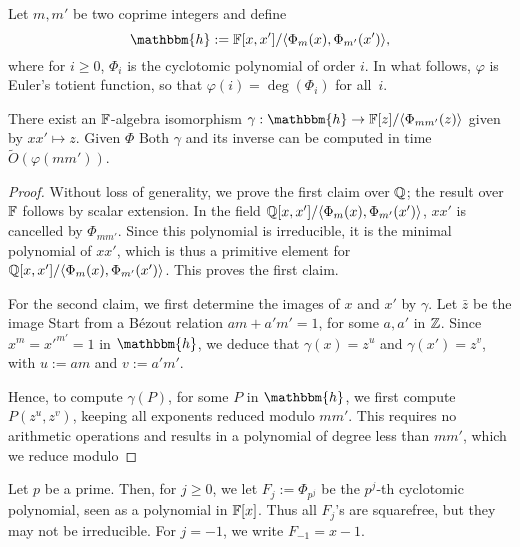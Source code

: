 Let $m,m'$ be two coprime integers and define
$$\mathbbm{h}:=\F[x,x']/\langle \Phi_{m}(x), \Phi_{m'}(x')\rangle,$$
where for $i \ge 0$, $\Phi_i$ is the cyclotomic polynomial of order
$i$. In what follows, $\varphi$ is Euler's totient function, so that
$\varphi(i) = \deg(\Phi_i)$ for all~$i$.
\begin{lemma}
  There exist an $\mathbb{F}$-algebra isomorphism $\gamma: \mathbbm{h} \to
  \F[z]/\langle\Phi_{mm'}(z)\rangle$ given by $xx' \mapsto z$. 
  Given $\Phi$
Both
  $\gamma$ and its inverse can be computed in time
  $\tilde{O}(\varphi(mm'))$.
\end{lemma}
\begin{proof}
  Without loss of generality, we prove the first claim over $\mathbb{Q}$; the
  result over $\mathbb{F}$ follows by scalar extension. In the field \sloppy
  $\mathbb{Q}[x,x']/\langle \Phi_{m}(x), \Phi_{m'}(x')\rangle$, $xx'$ is
  cancelled by $\Phi_{mm'}$. Since this polynomial is irreducible, it
  is the minimal polynomial of $xx'$, which is thus a primitive
  element for $\mathbb{Q}[x,x']/\langle \Phi_{m}(x),
  \Phi_{m'}(x')\rangle$. This proves the first claim.

  For the second claim, we first determine the images of $x$ and $x'$
  by $\gamma$. Let $\bar z$ be the image Start from a B\'ezout
  relation $am+ a'm'=1$, for some $a,a'$ in $\mathbb{Z}$.  Since $x^m =
  {x'}^{m'}=1$ in $\mathbbm{h}$, we deduce that $\gamma(x)=z^{u}$
  and $\gamma(x') = z^{v}$, with $u:=am$ and $v:=a'm'$.  

  Hence, to compute $\gamma(P)$, for some $P$ in $\mathbbm{h}$, we
  first compute $P(z^u, z^v)$, keeping all exponents reduced modulo
  $mm'$. This requires no arithmetic operations and results in a
  polynomial of degree less than $mm'$, which we reduce modulo 
\end{proof}



  Let $p$ be a prime. Then, for $j \ge 0$, we let
$F_j:=\Phi_{p^j}$ be the $p^j$-th cyclotomic polynomial, seen as a
polynomial in $\mathbb{F}[x]$. Thus all $F_j$'s are squarefree, but they may
not be irreducible. For $j=-1$, we write $F_{-1} = x-1$.

